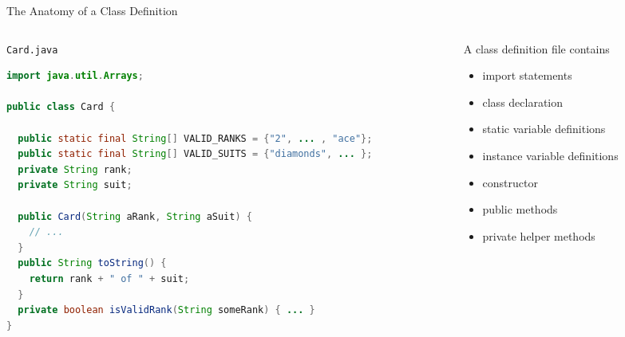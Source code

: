 \documentclass{beamer}
\begin{document}
\begin{frame}[fragile]{The Anatomy of a Class Definition}

\vspace{-.1in}
\begin{columns}[t]
\begin{column}{6.5cm}
{\tt Card.java}

\begin{lstlisting}[language=Java]
import java.util.Arrays;

public class Card {

  public static final String[] VALID_RANKS = {"2", ... , "ace"};
  public static final String[] VALID_SUITS = {"diamonds", ... };
  private String rank;
  private String suit;

  public Card(String aRank, String aSuit) {
    // ...
  }
  public String toString() {
    return rank + " of " + suit;
  }
  private boolean isValidRank(String someRank) { ... }
}
\end{lstlisting}
\end{column}

\begin{column}{5.5cm}
A class definition file contains
\vspace{.05in}
\begin{itemize}
\item import statements
\vspace{.05in}
\item class declaration
\vspace{.04in}
\item static variable definitions
\vspace{.27in}
\item instance variable definitions
\vspace{.03in}
\item constructor
\vspace{.25in}
\item public methods
\vspace{.23in}
\item private helper methods
\end{itemize}
\end{column}
\end{columns}


\end{frame}
\end{document}
